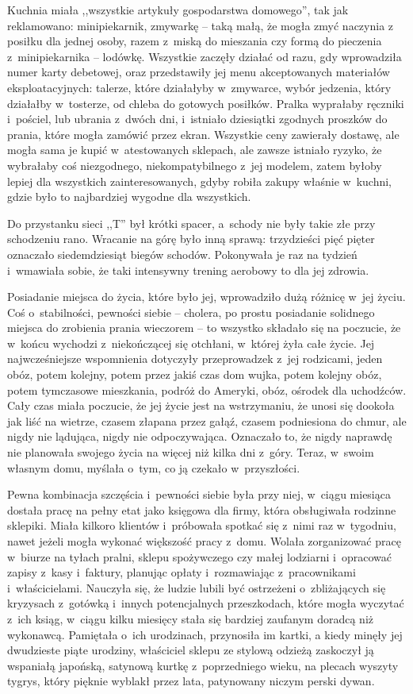 \documentclass[oneside,polish,11pt,sfheadings]{mwbk}
\begin{document}
Kuchnia miała ,,wszystkie artykuły gospodarstwa domowego'', tak jak
reklamowano: minipiekarnik, zmywarkę -- taką małą, że mogła zmyć naczynia
z posiłku dla jednej osoby, razem z~miską do mieszania czy formą do
pieczenia z~minipiekarnika -- lodówkę. Wszystkie zaczęły działać od razu,
gdy wprowadziła numer karty debetowej, oraz przedstawiły jej menu
akceptowanych materiałów eksploatacyjnych: talerze, które działałyby w~zmywarce, wybór jedzenia, który działałby w~tosterze, od chleba do
gotowych posiłków. Pralka wyprałaby ręczniki i~pościel, lub ubrania z~dwóch dni, i~istniało dziesiątki zgodnych proszków do prania, które
mogła zamówić przez ekran. Wszystkie ceny zawierały dostawę, ale mogła
sama je kupić w~atestowanych sklepach, ale zawsze istniało ryzyko, że
wybrałaby coś niezgodnego, niekompatybilnego z~jej modelem, zatem byłoby
lepiej dla wszystkich zainteresowanych, gdyby robiła zakupy właśnie w~kuchni, gdzie było to najbardziej wygodne dla wszystkich.

Do przystanku sieci ,,T'' był krótki spacer, a~schody nie były takie złe
przy schodzeniu rano. Wracanie na górę było inną sprawą: trzydzieści
pięć pięter oznaczało siedemdziesiąt biegów schodów. Pokonywała je raz
na tydzień i~wmawiała sobie, że taki intensywny trening aerobowy to dla
jej zdrowia.

Posiadanie miejsca do życia, które było jej, wprowadziło dużą różnicę w~jej życiu. Coś o~stabilności, pewności siebie -- cholera, po prostu
posiadanie solidnego miejsca do zrobienia prania wieczorem -- to wszystko
składało się na poczucie, że w~końcu wychodzi z~niekończącej się
otchłani, w~której żyła całe życie. Jej najwcześniejsze wspomnienia
dotyczyły przeprowadzek z~jej rodzicami, jeden obóz, potem kolejny,
potem przez jakiś czas dom wujka, potem kolejny obóz, potem tymczasowe
mieszkania, podróż do Ameryki, obóz, ośrodek dla uchodźców. Cały czas
miała poczucie, że jej życie jest na wstrzymaniu, że unosi się dookoła
jak liść na wietrze, czasem złapana przez gałąź, czasem podniesiona do
chmur, ale nigdy nie lądująca, nigdy nie odpoczywająca. Oznaczało to, że
nigdy naprawdę nie planowała swojego życia na więcej niż kilka dni z~góry. Teraz, w~swoim własnym domu, myślała o~tym, co ją czekało w~przyszłości.

Pewna kombinacja szczęścia i~pewności siebie była przy niej, w~ciągu
miesiąca dostała pracę na pełny etat jako księgowa dla firmy, która
obsługiwała rodzinne sklepiki. Miała kilkoro klientów i~próbowała
spotkać się z~nimi raz w~tygodniu, nawet jeżeli mogła wykonać większość
pracy z~domu. Wolała zorganizować pracę w~biurze na tyłach pralni,
sklepu spożywczego czy małej lodziarni i~opracować zapisy z~kasy i~faktury, planując opłaty i~rozmawiając z~pracownikami i~właścicielami.
Nauczyła się, że ludzie lubili być ostrzeżeni o~zbliżających się
kryzysach z~gotówką i~innych potencjalnych przeszkodach, które mogła
wyczytać z~ich ksiąg, w~ciągu kilku miesięcy stała się bardziej zaufanym
doradcą niż wykonawcą. Pamiętała o~ich urodzinach, przynosiła im kartki,
a kiedy minęły jej dwudzieste piąte urodziny, właściciel sklepu ze
stylową odzieżą zaskoczył ją wspaniałą japońską, satynową kurtkę z~poprzedniego wieku, na plecach wyszyty tygrys, który pięknie wyblakł
przez lata, patynowany niczym perski dywan.
\end{document}
